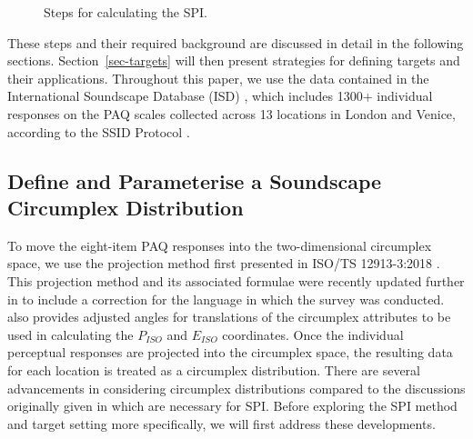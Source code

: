 \documentclass[
  authoryear,
  preprint,
  1p]{elsarticle}
\begin{document}
\begin{figure}


\caption{\label{fig-bespoke-spi}Steps for calculating the SPI.}

\end{figure}%

These steps and their required background are discussed in detail in the
following sections. Section~\ref{sec-targets} will then present
strategies for defining targets and their applications. Throughout this
paper, we use the data contained in the International Soundscape
Database (ISD) \citep{Mitchell2024International}, which includes 1300+
individual responses on the PAQ scales collected across 13 locations in
London and Venice, according to the SSID Protocol
\citep{Mitchell2020Soundscape}.

\subsection{Define and Parameterise a Soundscape Circumplex
Distribution}\label{sec-circumplex-distribution}

To move the eight-item PAQ responses into the two-dimensional circumplex
space, we use the projection method first presented in ISO/TS
12913-3:2018 \citep{ISO12913Part3}. This projection method and its
associated formulae were recently updated further in
\citet{Aletta2024Soundscape} to include a correction for the language in
which the survey was conducted. \citet{Aletta2024Soundscape} also
provides adjusted angles for translations of the circumplex attributes
to be used in calculating the \(P_{ISO}\) and \(E_{ISO}\) coordinates.
Once the individual perceptual responses are projected into the
circumplex space, the resulting data for each location is treated as a
circumplex distribution. There are several advancements in considering
circumplex distributions compared to the discussions originally given in
\citet{Mitchell2022How} which are necessary for SPI. Before exploring
the SPI method and target setting more specifically, we will first
address these developments.
\end{document}
